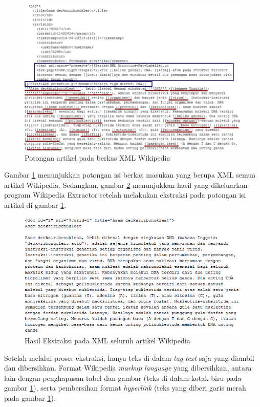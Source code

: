 \begin{figure}
	\centering
	\includegraphics[width=1\linewidth]{pics/wiki-XML-2}
	\caption{Potongan artikel pada berkas XML Wikipedia}
	\label{fig:wiki-XML}
\end{figure}
Gambar \ref{fig:wiki-XML} menunjukkan potongan isi berkas masukan yang berupa XML semua artikel Wikipedia. Sedangkan, gambar \ref{fig:hasil-ekstraksi} menunjukkan hasil yang dikeluarkan program Wikipedia Extractor setelah melakukan ekstraksi pada potongan isi artikel di gambar \ref{fig:wiki-XML}.
\begin{figure}
	\centering
	\includegraphics[width=1\linewidth]{pics/hasil-ekstraksi}
	\caption{Hasil Ekstraksi pada XML seluruh artikel Wikipedia}
	\label{fig:hasil-ekstraksi}
\end{figure}
\noindent Setelah melalui proses ekstraksi, hanya teks di dalam \textit{tag} \textit{text} saja yang diambil dan dibersihkan. Format Wikipedia \textit{markup language} yang dibersihkan, antara lain dengan penghapusan tabel dan gambar (teks di dalam kotak biru pada gambar \ref{fig:wiki-XML}), serta pembersihan format \textit{hyperlink} (teks yang diberi garis merah pada gambar \ref{fig:wiki-XML}).

